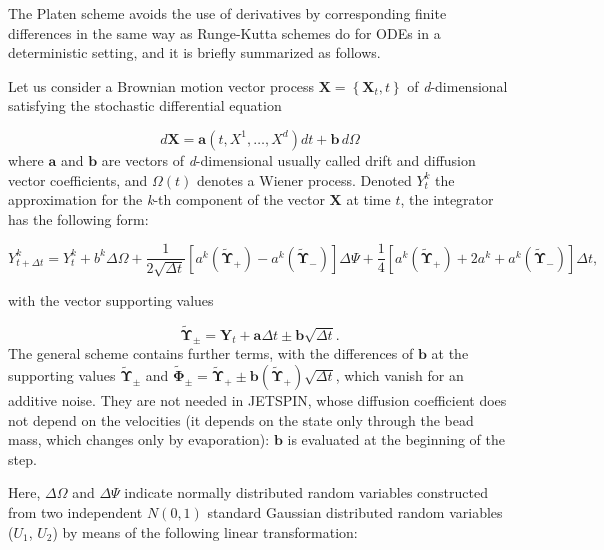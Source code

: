 The Platen scheme avoids the use of derivatives by corresponding finite
differences in the same way as Runge-Kutta schemes do for ODEs in
a deterministic setting, and it is briefly summarized as follows.

Let us consider a Brownian motion vector process $\textbf{X}=\left\{ \textbf{X}_{t},t\right\} $
of \textit{d}-dimensional satisfying the stochastic differential equation

\begin{equation}
d\textbf{X}=\textbf{a}\left(t,X^{1},\ldots,X^{d}\right)dt+\textbf{b}\,d\Omega\label{eq:generic-sde}
\end{equation}
where $\textbf{a}$ and $\textbf{b}$ are vectors of \textit{d}-dimensional
usually called drift and diffusion vector coefficients, and $\Omega\left(t\right)$
denotes a Wiener process. Denoted $Y_{t}^{k}$ the approximation for
the \textit{k}-th component of the vector $\textbf{X}$ at time $t$,
the integrator has the following form:

\begin{equation}
Y_{t+\varDelta t}^{k}=Y_{t}^{k}+b^{k}\Delta\Omega+\frac{1}{2\sqrt{\Delta t}}\left[a^{k}\left(\widetilde{\boldsymbol{\Upsilon}}_{+}\right)-a^{k}\left(\widetilde{\boldsymbol{\Upsilon}}_{-}\right)\right]\Delta\varPsi+\frac{1}{4}\left[a^{k}\left(\widetilde{\boldsymbol{\Upsilon}}_{+}\right)+2a^{k}+a^{k}\left(\widetilde{\boldsymbol{\Upsilon}}_{-}\right)\right]\Delta t,\label{eq:integrator-platen}
\end{equation}

with the vector supporting values

\begin{equation}
\widetilde{\boldsymbol{\Upsilon}}_{\pm}=\textbf{Y}_{t}+\textbf{a}\Delta t\pm\textbf{b}\sqrt{\Delta t}.
\end{equation}
The general scheme contains further terms, with the differences of
$\textbf{b}$ at the supporting values $\widetilde{\boldsymbol{\Upsilon}}_{\pm}$
and $\widetilde{\boldsymbol{\Phi}}_{\pm}=\widetilde{\boldsymbol{\Upsilon}}_{+}\pm\textbf{b}\left(\widetilde{\boldsymbol{\Upsilon}}_{+}\right)\sqrt{\Delta t}$,
which vanish for an additive noise. They are not needed in JETSPIN,
whose diffusion coefficient does not depend on the velocities (it
depends on the state only through the bead mass, which changes only
by evaporation): $\textbf{b}$ is evaluated at the beginning of the step.

Here, $\Delta\Omega$ and $\Delta\varPsi$ indicate normally distributed
random variables constructed from two independent $N\left(0,1\right)$
standard Gaussian distributed random variables ($U_{1}$, $U_{2}$)
by means of the following linear transformation:

